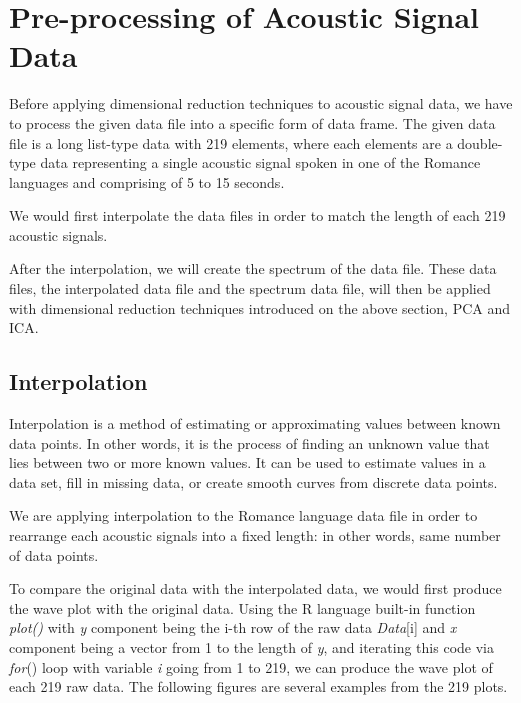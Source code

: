 \section{Pre-processing of Acoustic Signal Data}


Before applying dimensional reduction techniques to acoustic signal data, we have to process the given data file into a specific form of data frame. The given data file is a long list-type data with 219 elements, where each elements are a double-type data representing a single acoustic signal spoken in one of the Romance languages and comprising of 5 to 15 seconds. 

We would first interpolate the data files in order to match the length of each 219 acoustic signals.

After the interpolation, we will create the spectrum of the data file. These data files, the interpolated data file and the spectrum data file, will then be applied with dimensional reduction techniques introduced on the above section, PCA and ICA.


\subsection{Interpolation}


Interpolation is a method of estimating or approximating values between known data points. In other words, it is the process of finding an unknown value that lies between two or more known values. It can be used to estimate values in a data set, fill in missing data, or create smooth curves from discrete data points.

We are applying interpolation to the Romance language data file in order to rearrange each acoustic signals into a fixed length: in other words, same number of data points.

To compare the original data with the interpolated data, we would first produce the wave plot with the original data. Using the R language built-in function \emph{plot()} with \emph{y} component being the i-th row of the raw data \emph{Data}[i] and \emph{x} component being a vector from 1 to the length of \emph{y}, and iterating this code via \emph{for}() loop with variable \emph{i} going from 1 to 219, we can produce the wave plot of each 219 raw data. The following figures are several examples from the 219 plots.

